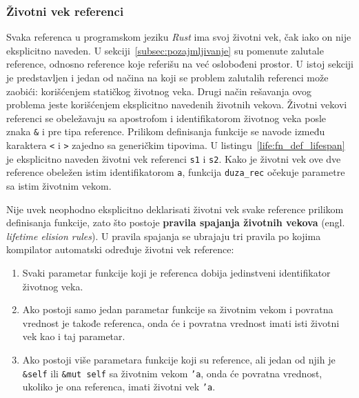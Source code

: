 \documentclass[12pt,oneside]{memoir}
\begin{document}



\subsubsection{Životni vek referenci}
Svaka referenca u programskom jeziku \emph{Rust} ima svoj životni vek, čak iako on nije
eksplicitno naveden. U sekciji~\ref{subsec:pozajmljivanje} su pomenute zalutale reference,
odnosno reference koje referišu na već oslobođeni prostor. U istoj sekciji je predstavljen
i jedan od načina na koji se problem zalutalih referenci može zaobići:
korišćenjem statičkog životnog veka. Drugi način rešavanja ovog problema jeste korišćenjem
eksplicitno navedenih životnih vekova.
Životni vekovi referenci se obeležavaju sa apostrofom i identifikatorom životnog veka posle
znaka \texttt{\&} i pre tipa reference. Prilikom definisanja funkcije se navode između
karaktera \texttt{<} i \texttt{>} zajedno sa generičkim tipovima.
U listingu~\ref{life:fn_def_lifespan} je eksplicitno naveden životni vek referenci
\texttt{s1} i \texttt{s2}. Kako je životni vek ove dve reference obeležen istim
identifikatorom \texttt{a}, funkcija \texttt{duza\_rec} očekuje parametre sa istim životnim vekom.



Nije uvek neophodno eksplicitno deklarisati životni vek svake reference prilikom
definisanja funkcije, zato što
postoje \textbf{pravila spajanja životnih vekova} (engl. \emph{lifetime elision rules}).
U pravila spajanja se ubrajaju tri
pravila po kojima kompilator automatski određuje životni vek reference:

\begin{enumerate}
  \item Svaki parametar funkcije koji je referenca dobija jedinstveni identifikator
        životnog veka.
  \item Ako postoji samo jedan parametar funkcije sa životnim vekom i povratna vrednost je
        takođe referenca, onda
        će i povratna vrednost imati isti životni vek kao i taj parametar.
  \item Ako postoji više parametara funkcije koji su reference, ali jedan od
        njih je \texttt{\&self} ili \texttt{\&mut self} sa životnim vekom \texttt{'a},
        onda će povratna vrednost, ukoliko je ona referenca, imati životni vek
        \texttt{'a}.
\end{enumerate}
\end{document}
